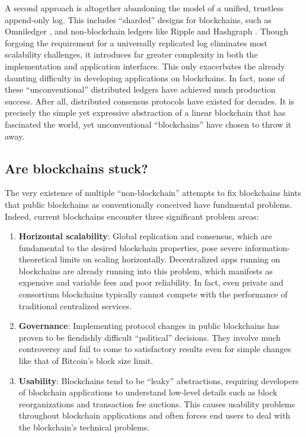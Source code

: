 \documentclass[headinclude,12pt]{scrbook}
\begin{document}
A second approach is altogether abandoning the model of a unified, trustless append-only log. This includes ``sharded'' designs for blockchains, such as Omniledger \cite{kokoris2018omniledger}, and non-blockchain ledgers like Ripple \cite{armknecht2015ripple} and Hashgraph \cite{baird2016swirlds}. Though forgoing the requirement for a universally replicated log eliminates most scalability challenges, it introduces far greater complexity in both the implementation and application interfaces. This only exacerbates the already daunting difficulty in developing applications on blockchains. In fact, none of these ``unconventional'' distributed ledgers have achieved much production success. After all, distributed consensus protocols have existed for decades. It is precisely the simple yet expressive abstraction of a linear blockchain that has fascinated the world, yet unconventional ``blockchains'' have chosen to throw it away.

\subsection{Are blockchains stuck?}

The very existence of multiple ``non-blockchain'' attempts to fix blockchains hints that public blockchains as conventionally conceived have fundmental problems. Indeed, current blockchains encounter three significant problem areas:

\begin{enumerate}
    \item \textbf{Horizontal scalability}: Global replication and consensus, which are fundamental to the desired blockchain properties, pose severe information-theoretical limits on scaling horizontally. Decentralized apps running on blockchains are already running into this problem, which manifests as expensive and variable fees and poor reliability. In fact, even private and consortium blockchains typically cannot compete with the performance of traditional centralized services.
    \item \textbf{Governance}: Implementing protocol changes in public blockchains has proven to be fiendishly difficult ``political'' decisions. They involve much controversy and fail to come to satisfactory results even for simple changes like that of Bitcoin's block size limit.
    \item \textbf{Usability}: Blockchains tend to be ``leaky'' abstractions, requiring developers of blockchain applications to understand low-level details such as block reorganizations and transaction fee auctions. This causes usability problems throughout blockchain applications and often forces end users to deal with the blockchain's technical problems.
\end{enumerate}
\end{document}
